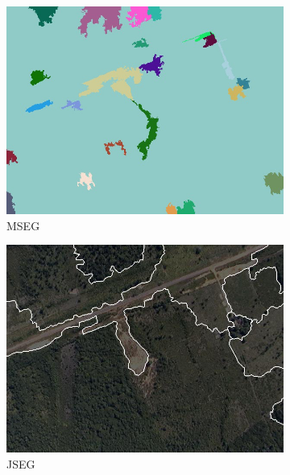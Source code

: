 \begin{figure}[htb]
\begin{minipage}[r]{\linewidth}
\begin{subfigure}{.32\linewidth}
			\includegraphics[width=\linewidth]{imgs/seg_mseg}
			\caption{MSEG}
		\end{subfigure}
		\begin{subfigure}{.32\linewidth}
			\includegraphics[width=\linewidth]{imgs/seg_jseg}
			\caption{JSEG}
		\end{subfigure}
	\end{minipage}
	\begin{minipage}[r]{\linewidth}
		\begin{subfigure}{.32\linewidth}

\end{subfigure}
\end{minipage}
\end{figure}

